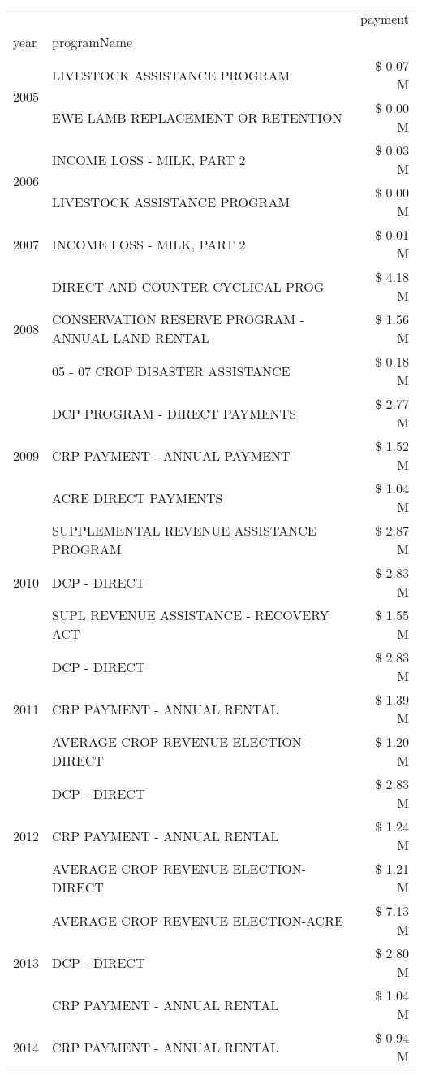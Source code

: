 \begin{tabular}{llr}
\toprule
 &  & payment \\
year & programName &  \\
\midrule
\multirow[t]{2}{*}{2005} & LIVESTOCK ASSISTANCE PROGRAM & \$ 0.07 M \\
 & EWE LAMB REPLACEMENT OR RETENTION & \$ 0.00 M \\
\cline{1-3}
\multirow[t]{2}{*}{2006} & INCOME LOSS - MILK, PART 2 & \$ 0.03 M \\
 & LIVESTOCK ASSISTANCE PROGRAM & \$ 0.00 M \\
\cline{1-3}
2007 & INCOME LOSS - MILK, PART 2 & \$ 0.01 M \\
\cline{1-3}
\multirow[t]{3}{*}{2008} & DIRECT AND COUNTER CYCLICAL PROG & \$ 4.18 M \\
 & CONSERVATION RESERVE PROGRAM - ANNUAL LAND RENTAL & \$ 1.56 M \\
 & 05 - 07 CROP DISASTER ASSISTANCE & \$ 0.18 M \\
\cline{1-3}
\multirow[t]{3}{*}{2009} & DCP PROGRAM - DIRECT PAYMENTS & \$ 2.77 M \\
 & CRP PAYMENT - ANNUAL PAYMENT & \$ 1.52 M \\
 & ACRE DIRECT PAYMENTS & \$ 1.04 M \\
\cline{1-3}
\multirow[t]{3}{*}{2010} & SUPPLEMENTAL REVENUE ASSISTANCE PROGRAM & \$ 2.87 M \\
 & DCP - DIRECT & \$ 2.83 M \\
 & SUPL REVENUE ASSISTANCE - RECOVERY ACT & \$ 1.55 M \\
\cline{1-3}
\multirow[t]{3}{*}{2011} & DCP - DIRECT & \$ 2.83 M \\
 & CRP PAYMENT - ANNUAL RENTAL & \$ 1.39 M \\
 & AVERAGE CROP REVENUE ELECTION-DIRECT & \$ 1.20 M \\
\cline{1-3}
\multirow[t]{3}{*}{2012} & DCP - DIRECT & \$ 2.83 M \\
 & CRP PAYMENT - ANNUAL RENTAL & \$ 1.24 M \\
 & AVERAGE CROP REVENUE ELECTION-DIRECT & \$ 1.21 M \\
\cline{1-3}
\multirow[t]{3}{*}{2013} & AVERAGE CROP REVENUE ELECTION-ACRE & \$ 7.13 M \\
 & DCP - DIRECT & \$ 2.80 M \\
 & CRP PAYMENT - ANNUAL RENTAL & \$ 1.04 M \\
\cline{1-3}
\multirow[t]{3}{*}{2014} & CRP PAYMENT - ANNUAL RENTAL & \$ 0.94 M \\

\end{tabular}
